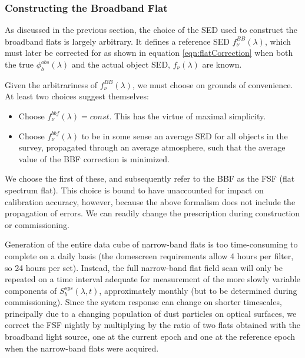 \documentclass[12pt,preprint]{aastex}
\begin{document}
\subsubsection{Constructing the Broadband Flat}
As discussed in the previous section, the choice of the SED used to construct the broadband flats is largely arbitrary.  It defines a reference SED $f_\nu^{BB}(\lambda)$,
which must later be corrected for as shown in equation \ref{eqn:flatCorrection}
when both the true $\phi_b^{obs}(\lambda)$ and the actual object SED, $f_\nu(\lambda)$ are known.     

Given the arbitrariness of $f_\nu^{BB}(\lambda)$,
we must choose on grounds of convenience.  At least two choices suggest themselves:

\begin{itemize}
\item{Choose $f_\nu^{bbf}(\lambda) = const$.  This has the virtue of maximal simplicity.}
\item{Choose $f_\nu^{bbf}(\lambda)$ to be in some sense an average SED for all objects in the survey, propagated
through an average atmosphere,  such that the average value
of the BBF correction is minimized.}
\end{itemize}

We choose the first of these, and subsequently refer to the BBF as the FSF (flat spectrum flat).  This choice is bound
to have unaccounted for impact on calibration accuracy, however, because the above formalism does not include the
propagation of errors.  We can readily change the prescription during construction or commissioning.


Generation of the entire data cube of narrow-band flats is too time-consuming to complete on a daily
basis (the domescreen requirements allow 4 hours per filter, so 24 hours per set).
Instead, the full narrow-band flat field scan will only be
repeated on a time interval adequate for measurement of
the more slowly variable components of $S_b^{sys}(\lambda,t)$, approximately
monthly (but to be determined during commissioning).   Since the system response can change 
on shorter timescales, principally due to a changing population of dust particles on optical surfaces, we correct the FSF
nightly by multiplying by the ratio of two flats obtained with the broadband light source, one at the current epoch and one at the 
reference epoch when the narrow-band flats were acquired.
\end{document}
